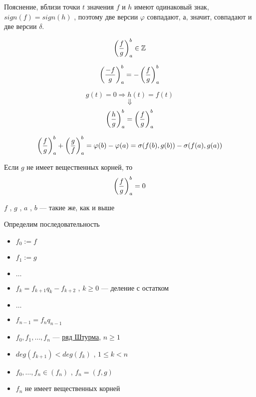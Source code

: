 \vspace


Пояснение, вблизи точки \( t \) значения \( f\) и \( h \) имеют одинаковый знак, \( sign(f) = sign(h) \) , поэтому две версии \( \varphi \) совпадают, а, значит, совпадают и две версии \( \delta \).

\vspace

\SSresume

\SSsect 
\[ \left( \frac{f}{g} \right)^b_a \in \mathbb{Z} \]

\SSsect
\[ \left( \frac{-f}{g} \right)^b_a = - \left( \frac{f}{g} \right)^b_a \]

\SSsect
\[ g(t) = 0 \Rightarrow h(t) = f(t) \]
\[ \Downarrow \]
\[ \left( \frac{h}{g} \right)^b_a = \left( \frac{f}{g} \right)^b_a \]

\SSsect
\[ \left( \frac{f}{g} \right)^b_a + \left( \frac{g}{f} \right)^b_a = \varphi(b)-\varphi(a) = \sigma(f(b),g(b)) - \sigma(f(a),g(a)) \]

\SSsect Если \( g \) не имеет вещественных корней, то
\[ \left( \frac{f}{g} \right)^b_a = 0 \]

\SSbullet

\begin{center}
    \( f \) , \( g \) , \( a \) , \( b \) --- такие же, как и выше
\end{center}

\SSsect Определим последовательность
\begin{itemize}[label=]
\item \( f_0 := f \)
\item \( f_1 := g \)
\item \( \dots \)
\item \( f_k = f_{k+1} q_k - f_{k+2} \) , \( k \geqslant 0 \) --- деление с остатком
\item \( \dots \)
\item \( f_{n-1} = f_n q_{n-1}\)
\end{itemize}

\SSsect 
\begin{itemize}[label=]
\item \( f_0,f_1,\dots,f_n \) --- \underline{ряд Штурма}, \( n \geqslant 1 \)   
\item \( deg(f_{k+1}) < deg(f_k) \) , \( 1 \leqslant k < n \)  
\item \( f_0,\dots,f_n \in (f_n) \) , \( f_n=(f,g) \)  
\item \( f_n \) не имеет вещественных корней  
\end{itemize}


